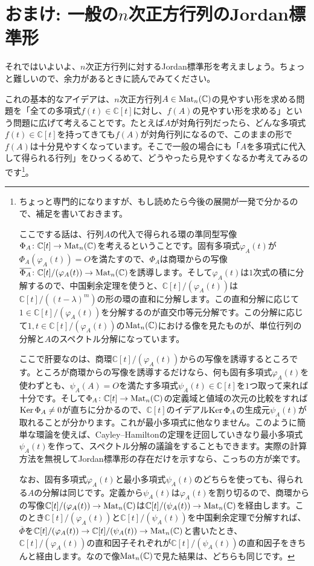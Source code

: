 \section{おまけ: 一般の$n$次正方行列のJordan標準形}

それではいよいよ、$n$次正方行列に対するJordan標準形を考えましょう。ちょっと難しいので、余力があるときに読んでみてください。

これの基本的なアイデアは、$n$次正方行列$A \in \operatorname{Mat}_n(\mathbb{C})$の見やすい形を求める問題を「全ての多項式$f(t) \in \mathbb{C}[t]$に対し、$f(A)$の見やすい形を求める」という問題に広げて考えることです。たとえば$A$が対角行列だったら、どんな多項式$f(t) \in \mathbb{C}[t]$を持ってきても$f(A)$が対角行列になるので、このままの形で$f(A)$は十分見やすくなっています。そこで一般の場合にも「$A$を多項式に代入して得られる行列」をひっくるめて、どうやったら見やすくなるか考えてみるのです\footnote{ちょっと専門的になりますが、もし読めたら今後の展開が一発で分かるので、補足を書いておきます。

ここでする話は、行列$A$の代入で得られる環の準同型写像$\Phi_A\colon \mathbb{C}[t] \rightarrow \operatorname{Mat}_n(\mathbb{C})$を考えるということです。固有多項式$\varphi_A(t)$が$\Phi_A(\varphi_A(t)) = O$を満たすので、$\Phi_A$は商環からの写像$\overline{\Phi_A}\colon \mathbb{C}[t]/(\varphi_A(t)) \rightarrow \operatorname{Mat}_n(\mathbb{C})$を誘導します。そして$\varphi_A(t)$は$1$次式の積に分解するので、中国剰余定理を使うと、$\mathbb{C}[t]/(\varphi_A(t))$は$\mathbb{C}[t]/((t - \lambda)^m)$の形の環の直和に分解します。この直和分解に応じて$1 \in \mathbb{C}[t]/(\varphi_A(t))$を分解するのが直交巾等元分解です。この分解に応じて$1, t \in \mathbb{C}[t]/(\varphi_A(t))$の$\operatorname{Mat}_n(\mathbb{C})$における像を見たものが、単位行列の分解と$A$のスペクトル分解になっています。

ここで肝要なのは、商環$\mathbb{C}[t]/(\varphi_A(t))$からの写像を誘導するところです。ところが商環からの写像を誘導するだけなら、何も固有多項式$\varphi_A(t)$を使わずとも、$\psi_A(A) = O$を満たす多項式$\psi_A(t) \in \mathbb{C}[t]$を$1$つ取って来れば十分です。そして$\Phi_A \colon \mathbb{C}[t] \rightarrow \operatorname{Mat}_n(\mathbb{C})$の定義域と値域の次元の比較をすれば$\operatorname{Ker} \Phi_A \neq 0$が直ちに分かるので、$\mathbb{C}[t]$のイデアル$\operatorname{Ker} \Phi_A$の生成元$\psi_A(t)$が取れることが分かります。これが最小多項式に他なりません。このように簡単な環論を使えば、Cayley--Hamiltonの定理を迂回していきなり最小多項式$\psi_A(t)$を作って、スペクトル分解の議論をすることもできます。実際の計算方法を無視してJordan標準形の存在だけを示すなら、こっちの方が楽です。

なお、固有多項式$\varphi_A(t)$と最小多項式$\psi_A(t)$のどちらを使っても、得られる$A$の分解は同じです。定義から$\psi_A(t)$は$\varphi_A(t)$を割り切るので、商環からの写像$\mathbb{C}[t]/(\varphi_A(t)) \rightarrow \operatorname{Mat}_n(\mathbb{C})$は$\mathbb{C}[t]/(\psi_A(t)) \rightarrow \operatorname{Mat}_n(\mathbb{C})$を経由します。このとき$\mathbb{C}[t]/(\varphi_A(t))$と$\mathbb{C}[t]/(\psi_A(t))$を中国剰余定理で分解すれば、$\overline{\Phi}$を$\mathbb{C}[t]/(\varphi_A(t)) \rightarrow \mathbb{C}[t]/(\psi_A(t)) \rightarrow \operatorname{Mat}_n(\mathbb{C})$と書いたとき、$\mathbb{C}[t]/(\varphi_A(t))$の直和因子それぞれが$\mathbb{C}[t]/(\psi_A(t))$の直和因子をきちんと経由します。なので像$\operatorname{Mat}_n(\mathbb{C})$で見た結果は、どちらも同じです。
}。

